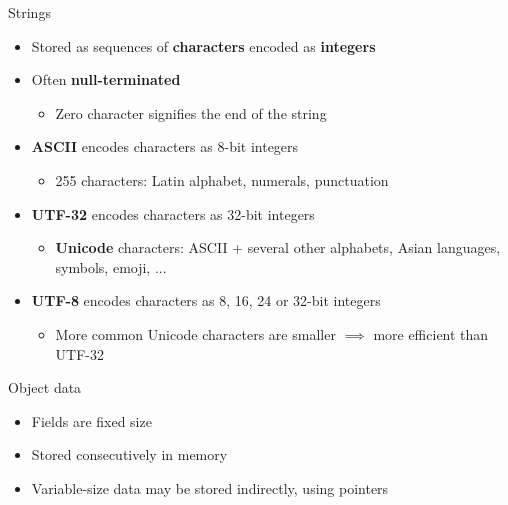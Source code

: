 \begin{frame}{Strings}
	\begin{itemize}
		\pause\item Stored as sequences of \textbf{characters} encoded as \textbf{integers}
		\pause\item Often \textbf{null-terminated}
			\begin{itemize}
				\pause\item Zero character signifies the end of the string
			\end{itemize}
		\pause\item \textbf{ASCII} encodes characters as 8-bit integers
			\begin{itemize}
				\pause\item 255 characters: Latin alphabet, numerals, punctuation
			\end{itemize}
		\pause\item \textbf{UTF-32} encodes characters as 32-bit integers
			\begin{itemize}
				\pause\item \textbf{Unicode} characters: ASCII + several other alphabets, Asian languages, symbols, emoji, ...
			\end{itemize}
		\pause\item \textbf{UTF-8} encodes characters as 8, 16, 24 or 32-bit integers
			\begin{itemize}
				\pause\item More common Unicode characters are smaller $\implies$ more efficient than UTF-32
			\end{itemize}
	\end{itemize}
\end{frame}

\begin{frame}{Object data}
	\begin{itemize}
		\pause\item Fields are fixed size
		\pause\item Stored consecutively in memory
		\pause\item Variable-size data may be stored indirectly, using pointers
	\end{itemize}
\end{frame}

